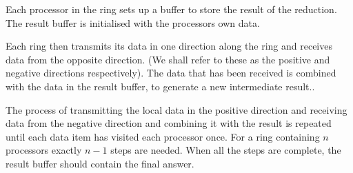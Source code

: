 Each processor in the ring sets up a buffer to store the result of the
reduction. The result buffer is initialised with the processors own data.

Each ring then transmits its data in one direction along the ring
and receives data from the opposite direction. (We shall refer to these 
as the positive and negative directions respectively). The data that
has been received is combined with the data in the result buffer, to 
generate a new intermediate result..

The process of transmitting the local data in the positive direction
and receiving data from the negative direction and combining it with the
result is repeated until each data item has visited each processor once.
For a ring containing $n$ processors exactly $n-1$ steps are needed.
When all the steps are complete, the result buffer should contain the
final answer.

